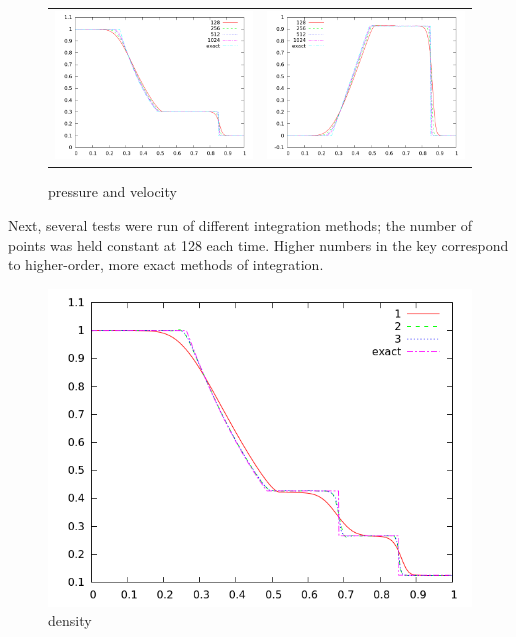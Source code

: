 \documentclass[letterpaper,12pt]{article}
\begin{document}
\begin{figure}
  \begin{center}
	\begin{tabular}{cc}
      \includegraphics[width=.425\textwidth]{prscellcomp_20} &
	  \includegraphics[width=.425\textwidth]{velcellcomp_20}
	\end{tabular}
  \end{center}
  \caption{pressure and velocity}
  \label{fig:pvcellcomp}
\end{figure}

    
Next, several tests were run of different integration methods; the number of points was held constant at 128 each time. Higher numbers in the key correspond to higher-order, more exact methods of integration. 

\begin{figure}[h]
  \begin{center}
    \includegraphics[width=.78\textwidth]{den128comp_20}
  \end{center}
  \caption{density}
\end{figure}
\end{document}
